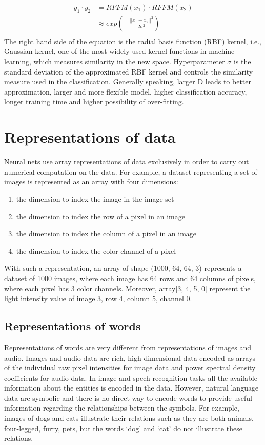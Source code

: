 \documentclass[12pt]{WSUThesis}
\theoremstyle{definition}
\begin{document}
\begin{align*}
	y_1 \cdot y_2
	&= RFFM(x_1) \cdot RFFM(x_2)\\
	&\approx exp(-\frac{||x_1-x_2||^2}{2\sigma^2})\\
\end{align*}
The right hand side of the equation is the radial basis function (RBF) kernel, i.e., Gaussian kernel, one of the most widely used kernel functions in machine learning, which measures similarity in the new space.
Hyperparameter $ \sigma $ is the standard deviation of the approximated RBF kernel and controls the similarity measure used in the classification.
Generally speaking, larger D leads to better approximation, larger and more flexible model, higher classification accuracy, longer training time and higher possibility of over-fitting.

\section{Representations of data}
Neural nets use array representations of data exclusively in order to carry out numerical computation on the data. For example, a dataset representing a set of images is represented as an array with four dimensions:
\begin{enumerate}
	\item the dimension to index the image in the image set
	\item the dimension to index the row of a pixel in an image
	\item the dimension to index the column of a pixel in an image
	\item the dimension to index the color channel of a pixel
\end{enumerate}
With such a representation, an array of shape (1000, 64, 64, 3) represents a dataset of 1000 images, where each image has 64 rows and 64 columns of pixels, where each pixel has 3 color channels.
Moreover, array[3, 4, 5, 0] represent the light intensity value of image 3, row 4, column 5, channel 0.

\subsection{Representations of words}
Representations of words are very different from representations of images and audio.
Images and audio data are rich, high-dimensional data encoded as arrays of the individual raw pixel intensities for image data and power spectral density coefficients for audio data.
In image and spech recognition tasks all the available information about the entities is encoded in the data.
However, natural language data are symbolic and there is no direct way to encode words to provide useful information regarding the relationships between the symbols.
For example, images of dogs and cats illustrate their relations such as they are both animals, four-legged, furry, pets, but the words `dog' and `cat' do not illustrate these relations.
\end{document}

